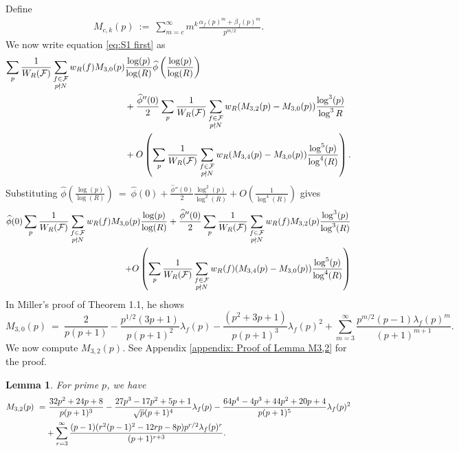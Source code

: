\documentclass[11pt, reqno]{amsart}
\newtheorem{lemma}[theorem]{Lemma}
\theoremstyle{definition}
\theoremstyle{remark}
\numberwithin{equation}{section}
\renewcommand{\hat}{\widehat}
\begin{document}
\noindent Define \begin{align}\label{def: M_(c,k)}
    M_{c,k}(p)\ :=\ \sum_{m=c}^{\infty}m^k\frac{\alpha_f(p)^{m}+\beta_f(p)^{m}}{p^{m/2}}.
\end{align} We now write equation \eqref{eq:S1 first}
as \begin{align}
    \sum_p\frac{1}{W_R(\mathcal{F})}\sum_{\substack{f \in \mathcal{F}\\p \nmid N}}w_R(f)M_{3,0}(p) &\frac{\log(p)}{\log(R)}\hat{\phi} \left(\frac{\log(p)}{\log(R)} \right)\\
    &+\frac{\hat{\phi}''(0)}{2}\sum_p\frac{1}{W_R(\mathcal{F})}\sum_{\substack{f \in \mathcal{F}\\p \nmid N}}w_R(M_{3,2}(p)-M_{3,0}(p))\frac{\log^3(p)}{\log^3 R} \notag \\
    &+O\left(\sum_p\frac{1}{W_R(\mathcal{F})}\sum_{\substack{f \in \mathcal{F}\\p \nmid N}}w_R(M_{3,4}(p)-M_{3,0}(p))\frac{\log^5 (p)}{\log^4(R)}  \right).
\end{align}
Substituting $\hat{\phi}\left(\frac{\log(p)}{\log(R)} \right)\ =\ \hat{\phi}(0)+\frac{\hat{\phi}''(0)}{2}\frac{\log^2(p)}{\log^2(R)}+O\left(\frac{1}{\log^4(R)}\right)$ gives
\begin{align} \label{eq: S1 fourth}
    \hat{\phi}(0)\sum_p\frac{1}{W_R(\mathcal{F})}\sum_{\substack{f \in \mathcal{F}\\p \nmid N}} w_R(f)M_{3,0}(p)\frac{\log(p)}{\log(R)}+\frac{\hat{\phi}''(0)}{2}\sum_p\frac{1}{W_R(\mathcal{F})}\sum_{\substack{f \in \mathcal{F}\\p \nmid N}} w_R(f)M_{3,2}(p)\frac{\log^3(p)}{\log^3(R)}& \notag \\
    +O\left(\sum_p\frac{1}{W_R(\mathcal{F})}\sum_{\substack{f \in \mathcal{F}\\p \nmid N}}w_R(f)(M_{3,4}(p)-M_{3,0}(p))\frac{\log^5 (p)}{\log^4(R)}  \right)&
\end{align}
In Miller's proof of Theorem 1.1, he shows
$$M_{3,0}(p)\ =\ \frac{2}{p(p+1)}-\frac{p^{1/2}(3p+1)}{p(p+1)^2}\lambda_f(p)-\frac{(p^2+3p+1)}{p(p+1)^3}\lambda_f(p)^2+\sum_{m=3}^{\infty}\frac{p^{m/2}(p-1)\lambda_f(p)^m}{(p+1)^{m+1}}.$$
We now compute $M_{3,2}(p).$ See Appendix \ref{appendix: Proof of Lemma M3,2} for the proof.
\begin{lemma}\label{Lemma, S_1}
    For prime $p$, we have 
    \begin{align} \label{eq: M_3,2 lemma compute}
        M_{3,2}(p)\ =&\ \frac{32p^2+24p+8}{p(p+1)^3} - \frac{27p^3-17p^2+5p+1}{\sqrt{p}(p+1)^4}\lambda_f(p)-\frac{64p^4-4p^3+44p^2+20p+4}{p(p+1)^5} \lambda_f(p)^2
        \notag\\&+ \sum_{r=3}^{\infty}\frac{(p-1)(r^2(p-1)^2-12rp-8p)p^{r/2}\lambda_f(p)^r}{(p+1)^{r+3}}.
    \end{align} 
\end{lemma}
\end{document}
